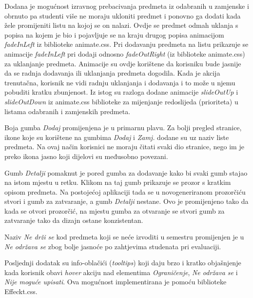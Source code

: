 \documentclass[times, utf8, zavrsni, numeric]{fer}
\begin{document}
        Dodana je mogućnost izravnog prebacivanja predmeta iz odabranih u zamjenske i obrnuto pa studenti više ne moraju ukloniti predmet i ponovno ga dodati kada žele promijeniti listu na kojoj se on nalazi. Ovdje se predmet odmah uklanja s popisa na kojem je bio i pojavljuje se na kraju drugog popisa animacijom \textit{fadeInLeft} iz biblioteke animate.css. Pri dodavanju predmeta na listu prikazuje se animacije \textit{fadeInLeft} pri dodaji odnosno \textit{fadeOutRight} (iz biblioteke animate.css) za uklanjanje predmeta. Animacije su ovdje korištene da korisniku bude jasnije da se radnja dodavanja ili uklanjanja predmeta dogodila. Kada je akcija trenutačna, korisnik ne vidi radnju uklanjanja i dodavanja i to može u njemu pobuditi kratku zbunjenost. Iz istog su razloga dodane animacije \textit{slideOutUp} i \textit{slideOutDown} iz animate.css biblioteke za mijenjanje redoslijeda (prioriteta) u listama odabranih i zamjenskih predmeta.
        
        Boja gumba \textit{Dodaj} promijenjena je u primarnu plavu. Za bolji pregled stranice, ikone koje su korištene na gumbima \textit{Dodaj} i \textit{Zamj.} dodane su uz naziv liste predmeta. Na ovaj način korisnici ne moraju čitati svaki dio stranice, nego im je preko ikona jasno koji dijelovi su međusobno povezani.
        
        Gumb \textit{Detalji} pomaknut je pored gumba za dodavanje kako bi svaki gumb stajao na istom mjestu u retku. Klikom na taj gumb prikazuje se prozor s kratkim opisom predmeta. Na postojećoj aplikaciji tada se u novogeneriranom prozorčiću stvori i gumb za zatvaranje, a gumb \textit{Detalji} nestane. Ovo je promijenjeno tako da kada se otvori prozorčić, na mjestu gumba za otvaranje se stvori gumb za zatvaranje tako da dizajn ostane konzistentan.
        
        Naziv \textit{Ne drži se} kod predmeta koji se neće izvoditi u semestru promijenjen je u \textit{Ne održava se} zbog bolje jasnoće po zahtjevima studenata pri evaluaciji.
        
        Posljednji dodatak su info-oblačići (\textit{tooltips}) koji daju brzo i kratko objašnjenje kada korisnik obavi \textit{hover} akciju nad elementima \textit{Ograničenje}, \textit{Ne održava se} i \textit{Nije moguće upisati}. Ova mogućnost implementirana je pomoću biblioteke Effeckt.css.
        
\end{document}
